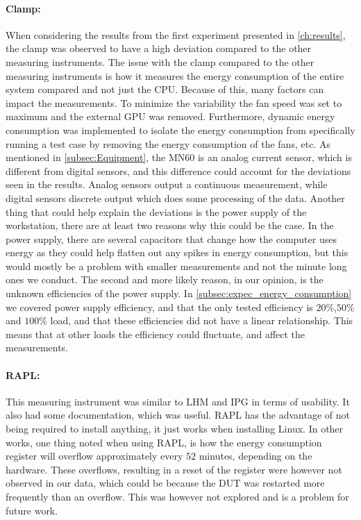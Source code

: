 \paragraph*{Clamp:} When considering the results from the first experiment presented in \cref{ch:results}, the clamp was observed to have a high deviation compared to the other measuring instruments. The issue with the clamp compared to the other measuring instruments is how it measures the energy consumption of the entire system compared and not just the CPU. Because of this, many factors can impact the measurements. To minimize the variability the fan speed was set to maximum and the external GPU was removed. Furthermore, dynamic energy consumption was implemented to isolate the energy consumption from specifically running a test case by removing the energy consumption of the fans, etc. As mentioned in \cref{subsec:Equipment}, the MN60 is an analog current sensor, which is different from digital sensors, and this difference could account for the deviations seen in the results. Analog sensors output a continuous measurement, while digital sensors discrete output which does some processing of the data.\cite{DigimonsVSAnamons} Another thing that could help explain the deviations is the power supply of the workstation, there are at least two reasons why this could be the case. In the power supply, there are several capacitors that change how the computer uses energy as they could help flatten out any spikes in energy consumption, but this would mostly be a problem with smaller measurements and not the minute long ones we conduct\cite{hackenberg2013}. The second and more likely reason, in our opinion, is the unknown efficiencies of the power supply. In \cref{subsec:expec_energy_consumption} we covered power supply efficiency, and that the only tested efficiency is $20$\%,$50$\% and $100$\% load, and that these efficiencies did not have a linear relationship. This means that at other loads the efficiency could fluctuate, and affect the measurements. 


\paragraph*{RAPL:} This measuring instrument was similar to LHM and IPG in terms of usability. It also had some documentation, which was useful. RAPL has the advantage of not being required to install anything, it just works when installing Linux. In other works\cite{RAPL_in_action}, one thing noted when using RAPL, is how the energy consumption register will overflow approximately every $52$ minutes, depending on the hardware. These overflows, resulting in a reset of the register were however not observed in our data, which could be because the DUT was restarted more frequently than an overflow. This was however not explored and is a problem for future work.

